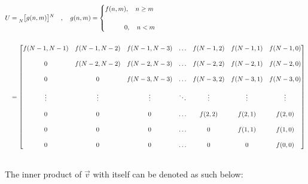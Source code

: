 \documentclass{article}
\begin{document}
\begin{align*}
    U&= \prescript{}{N}{\begin{bmatrix} g(n, m) \end{bmatrix}}^{N} \quad , \quad g(n, m) = \begin{cases}
                                                                                                            f(n, m), \quad n \geq m \\ \\
                                                                                                \quad \quad \quad 0, \quad n < m
                                                                                             \end{cases} \\ \\
     &= \begin{bmatrix}
            f(N - 1, N - 1) & f(N - 1, N - 2) & f(N - 1, N - 3) & \ldots & f(N - 1, 2) & f(N - 1, 1) & f(N - 1, 0) \\ \\
                          0 & f(N - 2, N - 2) & f(N - 2, N - 3) & \ldots & f(N - 2, 2) & f(N - 2, 1) & f(N - 2, 0) \\ \\
                          0 &               0 & f(N - 3, N - 3) & \ldots & f(N - 3, 2) & f(N - 3, 1) & f(N - 3, 0) \\ \\
                     \vdots &          \vdots &          \vdots & \ddots &      \vdots &      \vdots &      \vdots \\ \\
                          0 &               0 &               0 & \ldots & f(    2, 2) & f(    2, 1) & f(    2, 0) \\ \\
                          0 &               0 &               0 & \ldots &           0 & f(    1, 1) & f(    1, 0) \\ \\
                          0 &               0 &               0 & \ldots &           0 &           0 & f(    0, 0)
          \end{bmatrix} \\ \\
  \end{align*}

The inner product of $\vec{v}$ with itself can be denoted as such below:
\end{document}
